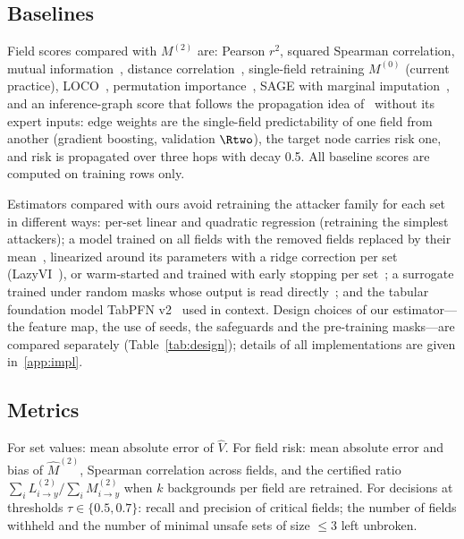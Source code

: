 \subsection{Baselines}
Field scores compared with $M^{(2)}$ are: Pearson $r^2$, squared Spearman correlation, mutual
information~\cite{kraskov2004mi}, distance correlation~\cite{szekely2007dcor}, single-field
retraining $M^{(0)}$ (current practice), LOCO~\cite{lei2018loco}, permutation
importance~\cite{breiman2001rf}, SAGE with marginal imputation~\cite{covert2020sage}, and an
inference-graph score that follows the propagation idea of~\cite{hu2026ignn} without its expert
inputs: edge weights are the single-field predictability of one field from another (gradient
boosting, validation $\Rtwo$), the target node carries risk one, and risk is propagated over three
hops with decay 0.5. All baseline scores are computed on training rows only.

Estimators compared with ours avoid retraining the attacker family for each set in different ways:
per-set linear and quadratic regression (retraining the simplest attackers); a model trained on all fields with the removed
fields replaced by their mean~\cite{williamson2020spvim}, linearized around its parameters with a ridge correction per set
(LazyVI~\cite{gao2022lazyvi}), or warm-started and trained with early stopping per set~\cite{sun2025warmstart}; a
surrogate trained under random masks whose output is read directly~\cite{covert2021explaining,jethani2022fastshap}; and the
tabular foundation model TabPFN v2~\cite{hollmann2025tabpfn} used in context. Design choices of our estimator---the feature
map, the use of seeds, the safeguards and the pre-training masks---are compared separately (Table~\ref{tab:design}); details
of all implementations are given in~\ref{app:impl}.

\subsection{Metrics}
For set values: mean absolute error of $\hat V$. For field risk: mean absolute error and bias of
$\hat M^{(2)}$, Spearman correlation across fields, and the certified ratio
$\sum_i L^{(2)}_{i\to y}/\sum_i M^{(2)}_{i\to y}$ when $k$ backgrounds per field are retrained.
For decisions at thresholds $\tau\in\{0.5,0.7\}$: recall and precision of critical fields; the
number of fields withheld and the number of minimal unsafe sets of size $\le 3$ left unbroken.
